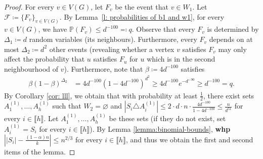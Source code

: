 \documentclass[notitlepage]{scrartcl}
\newcommand{\br}[1]{\llbracket{#1}\rrbracket}
\begin{document}
\begin{proof}
For every $v \in V(G)$, let $F_v$ be the event that $v\in W_1$. Let $\mathcal{F}\coloneqq \{F_v\}_{v\in V(G)}$. By Lemma~\ref{l: probabilities of b1 and w1}, for every $v\in V(G)$, we have $\mathbb{P}\left(F_v\right)\le d^{-100}\eqqcolon q$. Observe that every $F_v$ is determined by $\Delta_1\coloneqq d$ random variables (its neighbours). Furthermore, every $F_v$ depends on at most $\Delta_2\coloneqq d^2$ other events (revealing whether a vertex $v$ satisfies $F_v$ may only affect the probability that $u$ satisfies $F_u$ for $u$ which is in the second neighbourhood of $v$). Furthermore, note that $\beta\coloneqq 4d^{-100}$ satisfies 
\begin{align}\label{eq: beta q ineq}
    \beta(1-\beta)^{\Delta_2}&=4d^{-100}(1-4d^{-100})^{d^2}
    \ge 4d^{-100}e^{-d^{-90}}
    \ge d^{-100}=q.
\end{align}
By Corollary \ref{cor: lll}, we obtain that with probability at least $\frac{1}{2}$, there exist sets $A_1^{(1)},\ldots, A_h^{(1)}$ such that $W_2=\varnothing$ and $\left|S_i\triangle A_i^{(1)}\right|\le 2\cdot d\cdot n\cdot \frac{4d^{-100}}{1-4d^{-100}}\le \frac{n}{d^{51}}$ for every $i\in \br{h}$. Let $A_1^{(1)},\ldots, A_h^{(1)}$ be these sets (if they do not exist, set $A_i^{(1)}=S_i$ for every $i\in \br{h}$). By Lemma \ref{lemma:binomial-bounds}, \textbf{whp} $\left||S_i|-\frac{(1-\alpha)n}{k}\right|\le n^{2/3}$ for every $i\in \br{h}$, and thus we obtain the first and second items of the lemma. 


\end{proof}
\end{document}
